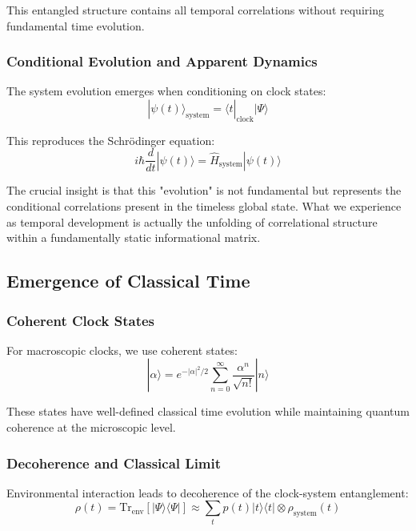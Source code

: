 \documentclass[12pt,a4paper]{article}
\newcommand{\ket}[1]{|#1\rangle}
\newcommand{\bra}[1]{\langle#1|}
\newcommand{\op}[1]{\hat{#1}}
\newcommand{\trace}{\text{Tr}}
\begin{document}
This entangled structure contains all temporal correlations without requiring fundamental time evolution.

\subsubsection{Conditional Evolution and Apparent Dynamics}

The system evolution emerges when conditioning on clock states:
\begin{equation}
    \ket{\psi(t)}_{\text{system}} = \bra{t}_{\text{clock}}\ket{\Psi}
\end{equation}

This reproduces the Schrödinger equation:
\begin{equation}
    i\hbar\frac{d}{dt}\ket{\psi(t)} = \op{H}_{\text{system}}\ket{\psi(t)}
\end{equation}

The crucial insight is that this "evolution" is not fundamental but represents the conditional correlations present in the timeless global state. What we experience as temporal development is actually the unfolding of correlational structure within a fundamentally static informational matrix.

\subsection{Emergence of Classical Time}

\subsubsection{Coherent Clock States}

For macroscopic clocks, we use coherent states:
\begin{equation}
    \ket{\alpha} = e^{-|\alpha|^2/2}\sum_{n=0}^{\infty} \frac{\alpha^n}{\sqrt{n!}}\ket{n}
\end{equation}

These states have well-defined classical time evolution while maintaining quantum coherence at the microscopic level.

\subsubsection{Decoherence and Classical Limit}

Environmental interaction leads to decoherence of the clock-system entanglement:
\begin{equation}
    \rho(t) = \trace_{\text{env}}[\ket{\Psi}\bra{\Psi}] \approx \sum_t p(t) \ket{t}\bra{t} \otimes \rho_{\text{system}}(t)
\end{equation}
\end{document}
